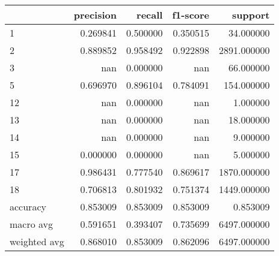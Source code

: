 \begin{tabular}{lrrrr}
\toprule
 & precision & recall & f1-score & support \\
\midrule
1 & 0.269841 & 0.500000 & 0.350515 & 34.000000 \\
2 & 0.889852 & 0.958492 & 0.922898 & 2891.000000 \\
3 & nan & 0.000000 & nan & 66.000000 \\
5 & 0.696970 & 0.896104 & 0.784091 & 154.000000 \\
12 & nan & 0.000000 & nan & 1.000000 \\
13 & nan & 0.000000 & nan & 18.000000 \\
14 & nan & 0.000000 & nan & 9.000000 \\
15 & 0.000000 & 0.000000 & nan & 5.000000 \\
17 & 0.986431 & 0.777540 & 0.869617 & 1870.000000 \\
18 & 0.706813 & 0.801932 & 0.751374 & 1449.000000 \\
accuracy & 0.853009 & 0.853009 & 0.853009 & 0.853009 \\
macro avg & 0.591651 & 0.393407 & 0.735699 & 6497.000000 \\
weighted avg & 0.868010 & 0.853009 & 0.862096 & 6497.000000 \\
\bottomrule
\end{tabular}
